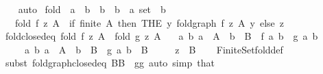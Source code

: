 \begin{isabellebody}
\ \ \isamarkupfalse%
\ auto%
\endisatagproof
{\isafoldproof}%
%
\isadelimproof
\isanewline
%
\endisadelimproof
\isanewline
{}\isamarkupfalse%
\ fold\ {\isacharcolon}{\kern0pt}{\isacharcolon}{\kern0pt}\ {\isachardoublequoteopen}{\isacharparenleft}{\kern0pt}{\isacharprime}{\kern0pt}a\ {\isasymRightarrow}\ {\isacharprime}{\kern0pt}b\ {\isasymRightarrow}\ {\isacharprime}{\kern0pt}b{\isacharparenright}{\kern0pt}\ {\isasymRightarrow}\ {\isacharprime}{\kern0pt}b\ {\isasymRightarrow}\ {\isacharprime}{\kern0pt}a\ set\ {\isasymRightarrow}\ {\isacharprime}{\kern0pt}b{\isachardoublequoteclose}\isanewline
\ \ \ {\isachardoublequoteopen}fold\ f\ z\ A\ {\isacharequal}{\kern0pt}\ {\isacharparenleft}{\kern0pt}if\ finite\ A\ then\ {\isacharparenleft}{\kern0pt}THE\ y{\isachardot}{\kern0pt}\ fold{\isacharunderscore}{\kern0pt}graph\ f\ z\ A\ y{\isacharparenright}{\kern0pt}\ else\ z{\isacharparenright}{\kern0pt}{\isachardoublequoteclose}\isanewline
\isanewline
{}\isamarkupfalse%
\ fold{\isacharunderscore}{\kern0pt}closed{\isacharunderscore}{\kern0pt}eq{\isacharcolon}{\kern0pt}\ {\isachardoublequoteopen}fold\ f\ z\ A\ {\isacharequal}{\kern0pt}\ fold\ g\ z\ A{\isachardoublequoteclose}\isanewline
\ \ \ {\isachardoublequoteopen}{\isasymAnd}a\ b{\isachardot}{\kern0pt}\ a\ {\isasymin}\ A\ {\isasymLongrightarrow}\ b\ {\isasymin}\ B\ {\isasymLongrightarrow}\ f\ a\ b\ {\isacharequal}{\kern0pt}\ g\ a\ b{\isachardoublequoteclose}\isanewline
\ \ \ \ \ {\isachardoublequoteopen}{\isasymAnd}a\ b{\isachardot}{\kern0pt}\ a\ {\isasymin}\ A\ {\isasymLongrightarrow}\ b\ {\isasymin}\ B\ {\isasymLongrightarrow}\ g\ a\ b\ {\isasymin}\ B{\isachardoublequoteclose}\isanewline
\ \ \ \ \ {\isachardoublequoteopen}z\ {\isasymin}\ B{\isachardoublequoteclose}\isanewline
%
\isadelimproof
\ \ %
\endisadelimproof
%
\isatagproof
{}\isamarkupfalse%
\ Finite{\isacharunderscore}{\kern0pt}Set{\isachardot}{\kern0pt}fold{\isacharunderscore}{\kern0pt}def\isanewline
\ \ \isamarkupfalse%
\ {\isacharparenleft}{\kern0pt}subst\ fold{\isacharunderscore}{\kern0pt}graph{\isacharunderscore}{\kern0pt}closed{\isacharunderscore}{\kern0pt}eq{\isacharbrackleft}{\kern0pt}\ B{\isacharequal}{\kern0pt}B\ \ g{\isacharequal}{\kern0pt}g{\isacharbrackright}{\kern0pt}{\isacharparenright}{\kern0pt}\ {\isacharparenleft}{\kern0pt}auto\ simp{\isacharcolon}{\kern0pt}\ that{\isacharparenright}{\kern0pt}%
\endisatagproof
{\isafoldproof}%
%
\isadelimproof
%
\endisadelimproof
%
\begin{isamarkuptext}%

\end{isamarkuptext}
\end{isabellebody}
